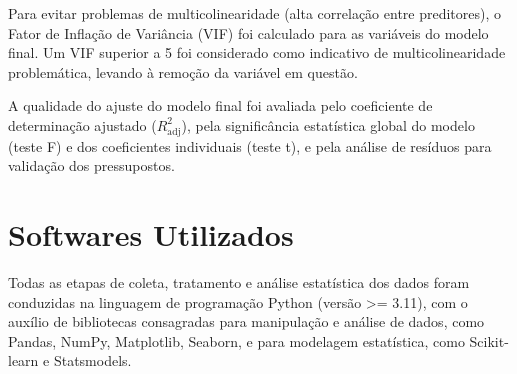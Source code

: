 Para evitar problemas de multicolinearidade (alta correlação entre preditores), o Fator de Inflação de Variância (VIF) foi calculado para as variáveis do modelo final. Um VIF superior a 5 foi considerado como indicativo de multicolinearidade problemática, levando à remoção da variável em questão.

A qualidade do ajuste do modelo final foi avaliada pelo coeficiente de determinação ajustado ($R^2_{\text{adj}}$), pela significância estatística global do modelo (teste F) e dos coeficientes individuais (teste t), e pela análise de resíduos para validação dos pressupostos.


\section{Softwares Utilizados}

Todas as etapas de coleta, tratamento e análise estatística dos dados foram conduzidas na linguagem de programação Python (versão >= 3.11), com o auxílio de bibliotecas consagradas para manipulação e análise de dados, como Pandas, NumPy, Matplotlib, Seaborn, e para modelagem estatística, como Scikit-learn e Statsmodels.

